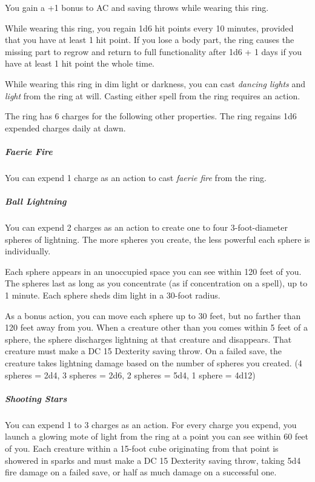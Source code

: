 \documentclass[10pt,a4paper,twoside,bg=print,twocolumn,openany,nodeprecatedcode]{dndbook}
\begin{document}
You gain a +1 bonus to AC and saving throws while wearing this ring.

While wearing this ring, you regain 1d6 hit points every 10 minutes, provided that you have at least 1 hit point. If you lose a body part, the ring causes the missing part to regrow and return to full functionality after 1d6 + 1 days if you have at least 1 hit point the whole time.

While wearing this ring in dim light or darkness, you can cast \textit{dancing lights} and \textit{light} from the ring at will. Casting either spell from the ring requires an action.

The ring has 6 charges for the following other properties. The ring regains 1d6 expended charges daily at dawn.

\subparagraph{Faerie Fire}
You can expend 1 charge as an action to cast \textit{faerie fire} from the ring.

\subparagraph{Ball Lightning}
You can expend 2 charges as an action to create one to four 3-foot-diameter spheres of lightning. The more spheres you create, the less powerful each sphere is individually.

Each sphere appears in an unoccupied space you can see within 120 feet of you. The spheres last as long as you concentrate (as if concentration on a spell), up to 1 minute. Each sphere sheds dim light in a 30-foot radius.

As a bonus action, you can move each sphere up to 30 feet, but no farther than 120 feet away from you. When a creature other than you comes within 5 feet of a sphere, the sphere discharges lightning at that creature and disappears. That creature must make a DC 15 Dexterity saving throw. On a failed save, the creature takes lightning damage based on the number of spheres you created. (4 spheres = 2d4, 3 spheres = 2d6, 2 spheres = 5d4, 1 sphere = 4d12)

\subparagraph{Shooting Stars}
You can expend 1 to 3 charges as an action. For every charge you expend, you launch a glowing mote of light from the ring at a point you can see within 60 feet of you. Each creature within a 15-foot cube originating from that point is showered in sparks and must make a DC 15 Dexterity saving throw, taking 5d4 fire damage on a failed save, or half as much damage on a successful one.
\end{document}
